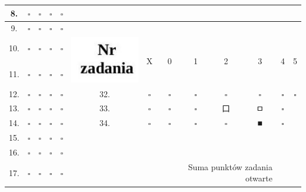 \documentclass[10pt]{article}
\begin{document}
\begin{center}
\begin{tabular}{|c|c|c|c|c|c|c|c|c|c|c|c|c|}
\hline
8. & \(\square\) & \(\square\) & \(\square\) & \(\square\) &  &  &  &  &  &  &  &  \\
\hline
9. & \(\square\) & \(\square\) & \(\square\) & \(\square\) &  &  &  &  &  &  &  &  \\
\hline
10. & \(\square\) & \(\square\) & \(\square\) & \(\square\) & \multirow[t]{2}{*}{\includegraphics[max width=\textwidth]{2024_11_21_0fa17f80dfe1c6bd3b66g-16(1)}
} & \multirow[t]{2}{*}{X} & \multirow[t]{2}{*}{0} & \multirow[t]{2}{*}{1} & \multirow[t]{2}{*}{2} & \multirow[t]{2}{*}{3} & \multirow[t]{2}{*}{4} & \multirow[t]{2}{*}{5} \\
\hline
11. & \(\square\) & \(\square\) & \(\square\) & \(\square\) &  &  &  &  &  &  &  &  \\
\hline
12. & \(\square\) & \(\square\) & \(\square\) & \(\square\) & 32. & \(\square\) & \(\square\) & \(\square\) & \(\square\) & \(\square\) & \(\square\) & \(\square\) \\
\hline
13. & \(\square\) & \(\square\) & \(\square\) & \(\square\) & 33. & \(\square\) & \(\square\) & \(\square\) & 口 & ㅁ & \(\square\) &  \\
\hline
14. & \(\square\) & \(\square\) & \(\square\) & \(\square\) & 34. & \(\square\) & \(\square\) & \(\square\) & \(\square\) & ■ & \(\square\) &  \\
\hline
15. & \(\square\) & \(\square\) & \(\square\) & \(\square\) &  &  &  &  &  &  &  &  \\
\hline
16. & \(\square\) & \(\square\) & \(\square\) & \(\square\) &  &  &  &  &  &  &  &  \\
\hline
17. & \(\square\) & \(\square\) & \(\square\) & \(\square\) &  &  & \multicolumn{4}{|r|}{\multirow[t]{2}{*}{Suma punktów zadania otwarte}} &  &  \\

\end{tabular}
\end{center}
\end{document}
